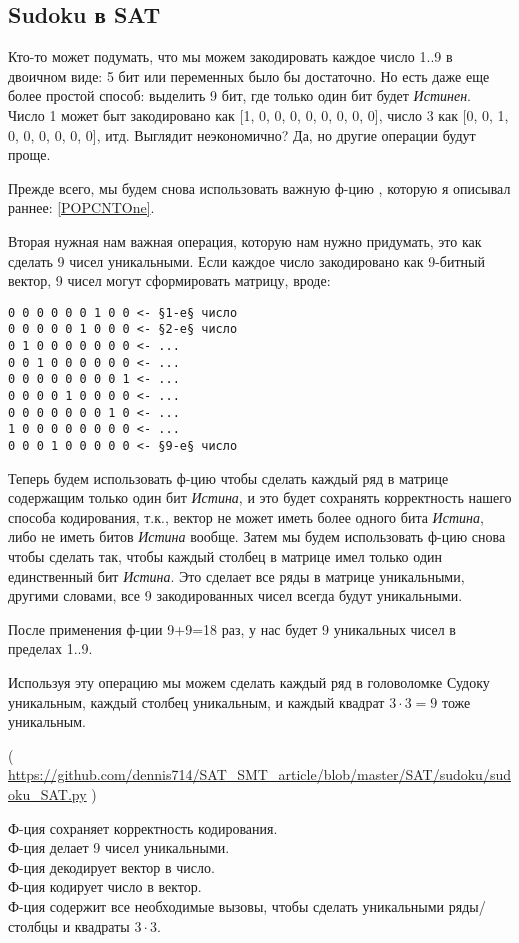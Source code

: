 \subsection{Sudoku в SAT}
\label{Sudoku_SAT}

Кто-то может подумать, что мы можем закодировать каждое число 1..9 в двоичном виде: 5 бит или переменных было бы достаточно.
Но есть даже еще более простой способ: выделить 9 бит, где только один бит будет \textit{Истинен}.
Число 1 может быт закодировано как [1, 0, 0, 0, 0, 0, 0, 0, 0], число 3 как [0, 0, 1, 0, 0, 0, 0, 0, 0], итд.
Выглядит неэкономично? Да, но другие операции будут проще.

Прежде всего, мы будем снова использовать важную ф-цию , которую я описывал раннее: \ref{POPCNTOne}.

Вторая нужная нам важная операция, которую нам нужно придумать, это как сделать 9 чисел уникальными.
Если каждое число закодировано как 9-битный вектор, 9 чисел могут сформировать матрицу, вроде:

\begin{lstlisting}
0 0 0 0 0 0 1 0 0 <- §1-е§ число
0 0 0 0 0 1 0 0 0 <- §2-е§ число
0 1 0 0 0 0 0 0 0 <- ...
0 0 1 0 0 0 0 0 0 <- ...
0 0 0 0 0 0 0 0 1 <- ...
0 0 0 0 1 0 0 0 0 <- ...
0 0 0 0 0 0 0 1 0 <- ...
1 0 0 0 0 0 0 0 0 <- ...
0 0 0 1 0 0 0 0 0 <- §9-е§ число
\end{lstlisting}

Теперь будем использовать ф-цию  чтобы сделать каждый ряд в матрице содержащим только один бит \textit{Истина},
и это будет сохранять корректность нашего способа кодирования, т.к., вектор не может иметь более одного бита \textit{Истина},
либо не иметь битов \textit{Истина} вообще.
Затем мы будем использовать ф-цию  снова чтобы сделать так, чтобы каждый столбец в матрице имел только
один единственный бит \textit{Истина}.
Это сделает все ряды в матрице уникальными, другими словами, все 9 закодированных чисел всегда будут уникальными.

После применения ф-ции  9+9=18 раз, у нас будет 9 уникальных чисел в пределах 1..9.

Используя эту операцию мы можем сделать каждый ряд в головоломке Судоку уникальным, каждый столбец уникальным,
и каждый квадрат $3 \cdot 3=9$ тоже уникальным.


( \url{https://github.com/dennis714/SAT_SMT_article/blob/master/SAT/sudoku/sudoku_SAT.py} )

Ф-ция  сохраняет корректность кодирования.\\
Ф-ция  делает 9 чисел уникальными.\\
Ф-ция  декодирует вектор в число.\\
Ф-ция  кодирует число в вектор.\\
Ф-ция  содержит все необходимые вызовы, чтобы сделать уникальными ряды/столбцы и квадраты $3\cdot 3$.

